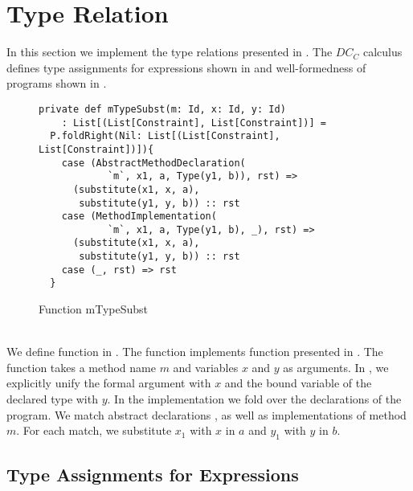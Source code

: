 \section{Type Relation}
In this section we implement the type relations presented in .
The $DC_C$ calculus defines type assignments for expressions
shown in 
and well-formedness of programs shown in .
%
\begin{figure}[h]
\begin{lstlisting}
private def mTypeSubst(m: Id, x: Id, y: Id)
    : List[(List[Constraint], List[Constraint])] =
  P.foldRight(Nil: List[(List[Constraint], List[Constraint])]){
    case (AbstractMethodDeclaration(
            `m`, x1, a, Type(y1, b)), rst) =>
      (substitute(x1, x, a),
       substitute(y1, y, b)) :: rst
    case (MethodImplementation(
            `m`, x1, a, Type(y1, b), _), rst) =>
      (substitute(x1, x, a),
       substitute(y1, y, b)) :: rst
    case (_, rst) => rst
  }
\end{lstlisting}
\caption{Function mTypeSubst}
\label{fig:scala-mtype}
\end{figure}\\
We define function  in .
The function implements function 
presented in .
The function takes a method name $m$ and
variables $x$ and $y$ as arguments.
In , we explicitly unify the formal argument
with $x$ and the bound variable of the declared type with $y$.
In the implementation we fold over the declarations of the program.
We match abstract declarations ,
as well as implementations  of method $m$.
For each match, we substitute $x_1$ with $x$ in $a$ and $y_1$ with $y$ in $b$.


\subsection{Type Assignments for Expressions}
\label{sec:typeass}

